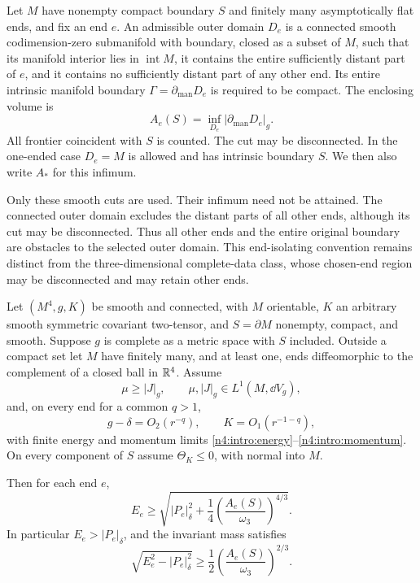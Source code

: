 \begin{definition}\label{n4:def:cuts}
Let \(M\) have nonempty compact boundary \(S\) and finitely many
asymptotically flat ends, and fix an end \(e\).
An admissible outer domain \(D_e\) is a connected smooth
codimension-zero submanifold with boundary, closed as a subset of \(M\),
such that its manifold interior lies in \(\operatorname{int}M\),
it contains the entire sufficiently distant part of \(e\), and
it contains no sufficiently distant part of any other end.
Its entire intrinsic manifold boundary
\(\Gamma=\partial_{\mathrm{man}}D_e\) is required to be compact.
The enclosing volume is
\[
 A_e(S)=\inf_{D_e}|\partial_{\mathrm{man}}D_e|_g.
\]
All frontier coincident with \(S\) is counted. The cut may be
disconnected. In the one-ended case \(D_e=M\) is allowed and has
intrinsic boundary \(S\). We then also write \(A_*\) for this infimum.
\end{definition}

Only these smooth cuts are used. Their infimum need not be attained.
The connected outer domain excludes the distant parts of all other
ends, although its cut may be disconnected. Thus all other ends and
the entire original boundary are obstacles
to the selected outer domain. This end-isolating convention remains
distinct from the three-dimensional complete-data class, whose
chosen-end region may be disconnected and may retain other ends.

\begin{theorem}\label{n4:thm:weak}
Let \((M^4,g,K)\) be smooth and
connected, with \(M\) orientable, \(K\) an arbitrary smooth symmetric
covariant two-tensor, and \(S=\partial M\) nonempty, compact, and smooth.
Suppose \(g\) is complete as a metric space with \(S\) included.
Outside a compact set let \(M\) have finitely many, and at least one,
ends diffeomorphic to the complement of a closed ball in \(\mathbb R^4\).
Assume
\[
 \mu\ge|J|_g,\qquad \mu,|J|_g\in L^1(M,\dd V_g),
\]
and, on every end for a common \(q>1\),
\[
 g-\delta=O_2(r^{-q}),\qquad K=O_1(r^{-1-q}),
\]
with finite energy and momentum limits
\eqref{n4:intro:energy}--\eqref{n4:intro:momentum}.
On every component of \(S\) assume \(\Theta_K\le0\), with normal into \(M\).

Then for each end \(e\),
\begin{equation}\label{n4:intro:main}
 E_e\ge
 \sqrt{|P_e|_\delta^2+
       \frac14\left(\frac{A_e(S)}{\omega_3}\right)^{4/3}}.
\end{equation}
In particular \(E_e>|P_e|_\delta\), and the invariant mass satisfies
\begin{equation}\label{n4:intro:mass}
 \sqrt{E_e^2-|P_e|_\delta^2}
   \ge\frac12\left(\frac{A_e(S)}{\omega_3}\right)^{2/3}.
\end{equation}
\end{theorem}

